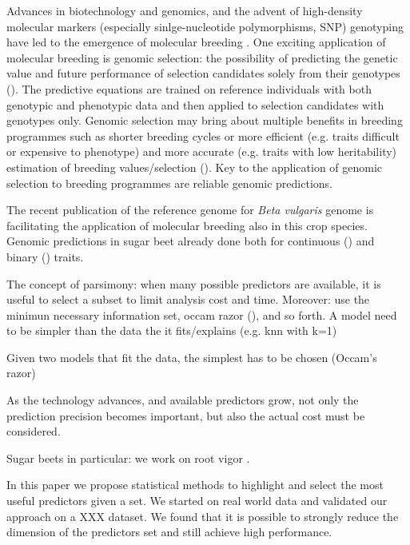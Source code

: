 Advances in biotechnology and genomics, and the advent of high-density
molecular markers (especially sinlge-nucleotide polymorphisms, SNP)
genotyping have led to the emergence of molecular breeding
\cite{moose2008molecular}.
One exciting application of molecular breeding is genomic selection: the possibility of predicting the genetic value and future
performance of selection candidates solely from their genotypes (\cite{meuwissen2001prediction}). The predictive equations are
trained on reference individuals with both genotypic and phenotypic data and then
applied to selection candidates with genotypes only. Genomic selection
may bring about multiple benefits in breeding programmes such as
shorter breeding cycles or more efficient (e.g. traits difficult or
expensive to phenotype) and more accurate (e.g. traits with low
heritability) estimation of breeding values/selection
(\cite{goddard2007genomic,heffner2010plant}).
Key to the application of genomic selection to breeding programmes are reliable genomic
predictions.

The recent publication of the reference genome for \emph{Beta
vulgaris} genome \cite{dohm2013genome} is facilitating the application
of molecular breeding also in this crop species. Genomic predictions in sugar beet already
done both for continuous (\cite{hofheinz2012genome,wurschum2013genomic}) and binary
(\cite{biscarini2014genome}) traits.

The concept of parsimony: when many possible predictors are available, it is
useful to select a subset to limit analysis cost and time. Moreover: use
the minimun necessary information set, occam razor (\cite{chaitin2006limits}), and so forth.
A model need to be simpler than the data the it fits/explains (e.g. knn with k=1)

Given two models that fit the data, the simplest has to be chosen (Occam's razor)


As the technology advances, and available predictors grow, not only the 
prediction precision becomes important, but also the actual cost must
be considered.

Sugar beets in particular: we work on root vigor \cite{biscarini2014genome}.

In this paper we propose statistical methods to highlight and select the 
most useful predictors given a set. We started on real world data and validated
our approach on a XXX dataset. We found that it is possible to strongly reduce
the dimension of the predictors set and still achieve high performance.


